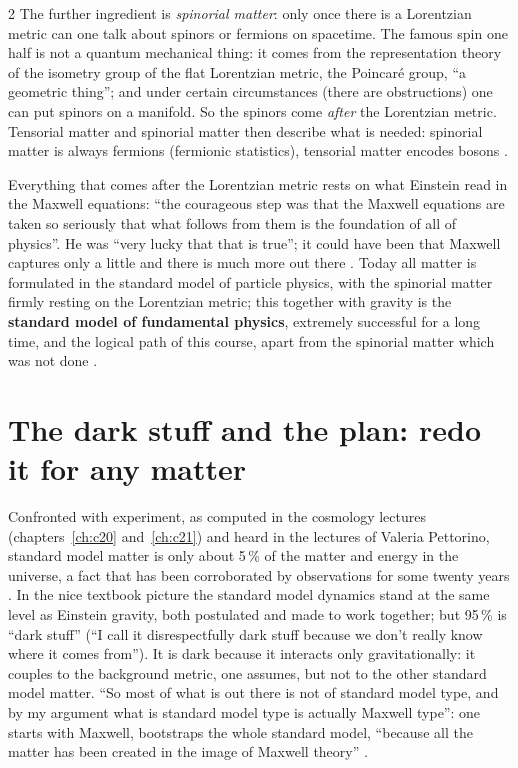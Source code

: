\begin{paracol}{2}
The further ingredient is \emph{spinorial matter}: only once there is a Lorentzian metric can one talk about spinors or fermions on spacetime. The famous spin one half is not a quantum mechanical thing: it comes from the representation theory of the isometry group of the flat Lorentzian metric, the Poincar\'e group, ``a geometric thing''; and under certain circumstances (there are obstructions) one can put spinors on a manifold. So the spinors come \emph{after} the Lorentzian metric. Tensorial matter and spinorial matter then describe what is needed: spinorial matter is always fermions (fermionic statistics), tensorial matter encodes bosons .

Everything that comes after the Lorentzian metric rests on what Einstein read in the Maxwell equations: ``the courageous step was that the Maxwell equations are taken so seriously that what follows from them is the foundation of all of physics''. He was ``very lucky that that is true''; it could have been that Maxwell captures only a little and there is much more out there . Today all matter is formulated in the standard model of particle physics, with the spinorial matter firmly resting on the Lorentzian metric; this together with gravity is the \textbf{standard model of fundamental physics}, extremely successful for a long time, and the logical path of this course, apart from the spinorial matter which was not done .

\section{The dark stuff and the plan: redo it for any matter}\label{sec:c26-plan}

Confronted with experiment, as computed in the cosmology lectures (chapters~\ref{ch:c20} and~\ref{ch:c21}) and heard in the lectures of Valeria Pettorino, standard model matter is only about 5\,\% of the matter and energy in the universe, a fact that has been corroborated by observations for some twenty years . In the nice textbook picture the standard model dynamics stand at the same level as Einstein gravity, both postulated and made to work together; but 95\,\% is ``dark stuff'' (``I call it disrespectfully dark stuff because we don't really know where it comes from''). It is dark because it interacts only gravitationally: it couples to the background metric, one assumes, but not to the other standard model matter. ``So most of what is out there is not of standard model type, and by my argument what is standard model type is actually Maxwell type'': one starts with Maxwell, bootstraps the whole standard model, ``because all the matter has been created in the image of Maxwell theory'' .


\end{paracol}
